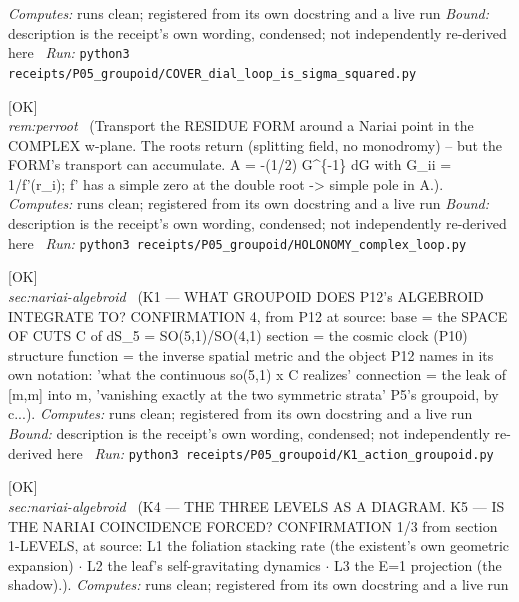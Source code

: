 \begin{description}
\emph{Computes:} runs clean; registered from its own docstring and a live run
 \emph{Bound:} description is the receipt's own wording, condensed; not independently re-derived here
\ \emph{Run:} \texttt{python3 receipts/P05\_groupoid/COVER\_dial\_loop\_is\_sigma\_squared.py}
\item[\rcptlabel{HOLONOMY_complex_loop}{P5R6}\textbf{P5R6}\quad\texttt{HOLONOMY\_complex\_loop}]\hfill\textsf{[OK]}\\
\textit{rem:perroot} \ (Transport the RESIDUE FORM around a Nariai point in the COMPLEX w-plane. The roots return (splitting field, no monodromy) -- but the FORM's transport can accumulate. A = -(1/2) G\textasciicircum{}\{-1\} dG with G\_ii = 1/f'(r\_i); f' has a simple zero at the double root -> simple pole in A.). 
\emph{Computes:} runs clean; registered from its own docstring and a live run
 \emph{Bound:} description is the receipt's own wording, condensed; not independently re-derived here
\ \emph{Run:} \texttt{python3 receipts/P05\_groupoid/HOLONOMY\_complex\_loop.py}
\item[\rcptlabel{K1_action_groupoid}{P5R7}\textbf{P5R7}\quad\texttt{K1\_action\_groupoid}]\hfill\textsf{[OK]}\\
\textit{sec:nariai-algebroid} \ (K1 --- WHAT GROUPOID DOES P12's ALGEBROID INTEGRATE TO? CONFIRMATION 4, from P12 at source: base = the SPACE OF CUTS C of dS\_5 = SO(5,1)/SO(4,1) section = the cosmic clock (P10) structure function = the inverse spatial metric and the object P12 names in its own notation: 'what the continuous so(5,1) \textbar{}x C realizes' connection = the leak of [m,m] into m, 'vanishing exactly at the two symmetric strata' P5's groupoid, by c...). 
\emph{Computes:} runs clean; registered from its own docstring and a live run
 \emph{Bound:} description is the receipt's own wording, condensed; not independently re-derived here
\ \emph{Run:} \texttt{python3 receipts/P05\_groupoid/K1\_action\_groupoid.py}
\item[\rcptlabel{K45_span_and_nariai}{P5R9}\textbf{P5R9}\quad\texttt{K45\_span\_and\_nariai}]\hfill\textsf{[OK]}\\
\textit{sec:nariai-algebroid} \ (K4 --- THE THREE LEVELS AS A DIAGRAM. K5 --- IS THE NARIAI COINCIDENCE FORCED? CONFIRMATION 1/3 from section 1-LEVELS, at source: L1 the foliation stacking rate (the existent's own geometric expansion) \ensuremath{\cdot} L2 the leaf's self-gravitating dynamics \ensuremath{\cdot} L3 the E=1 projection (the shadow).). 
\emph{Computes:} runs clean; registered from its own docstring and a live run

\end{description}
